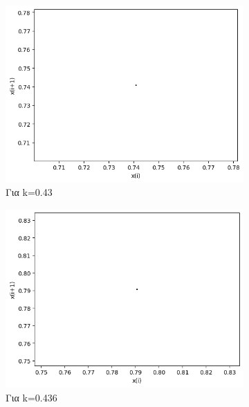 \begin{figure}[h!]
	\centering
	\begin{subfigure}[b]{0.4\textwidth}
		\centering
		\includegraphics[width=\textwidth]{LateX images/graphs q09/g3}
		\caption{Για k=0.43}
		\label{f:k48}
	\end{subfigure}
	\hfill
	\begin{subfigure}[b]{0.4\textwidth}
		\centering
		\includegraphics[width=\textwidth]{LateX images/graphs q09/g4}
		\caption{Για k=0.436}
		\label{f:k49}
	\end{subfigure}
	\hfill
	\begin{subfigure}[b]{0.4\textwidth}
		\centering

\end{subfigure}
\end{figure}
